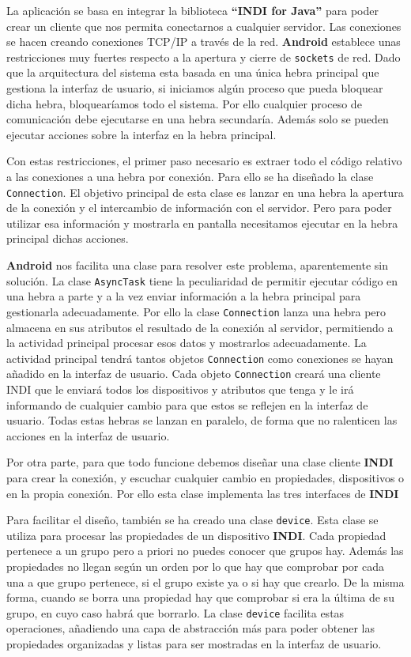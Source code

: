 La aplicación se basa en integrar la biblioteca \textbf{``INDI for Java''} para poder crear un cliente que nos permita conectarnos a cualquier servidor. Las conexiones se hacen creando conexiones TCP/IP a través de la red. \textbf{Android} establece unas restricciones muy fuertes respecto a la apertura y cierre de \texttt{sockets} de red. Dado que la arquitectura del sistema esta basada en una única hebra principal que gestiona la interfaz de usuario, si iniciamos algún proceso que pueda bloquear dicha hebra, bloquearíamos todo el sistema. Por ello cualquier proceso de comunicación debe ejecutarse en una hebra secundaría. Además solo se pueden ejecutar acciones sobre la interfaz en la hebra principal.

\bigskip
Con estas restricciones, el primer paso necesario es extraer todo el código relativo a las conexiones a una hebra por conexión. Para ello se ha diseñado la clase \texttt{Connection}. El objetivo principal de esta clase es lanzar en una hebra la apertura de la conexión y el intercambio de información con el servidor. Pero para poder utilizar esa información y mostrarla en pantalla necesitamos ejecutar en la hebra principal dichas acciones. 

\bigskip
\textbf{Android} nos facilita una clase para resolver este problema, aparentemente sin solución. La clase \texttt{AsyncTask} tiene la peculiaridad de permitir ejecutar código en una hebra a parte y a la vez enviar información a la hebra principal para gestionarla adecuadamente. Por ello la clase \texttt{Connection} lanza una hebra pero almacena en sus atributos el resultado de la conexión al servidor, permitiendo a la actividad principal procesar esos datos y mostrarlos adecuadamente. La actividad principal tendrá tantos objetos \texttt{Connection} como conexiones se hayan añadido en la interfaz de usuario. Cada objeto \texttt{Connection} creará una cliente INDI que le enviará todos los dispositivos y atributos que tenga y le irá informando de cualquier cambio para que estos se reflejen en la interfaz de usuario. Todas estas hebras se lanzan en paralelo, de forma que no ralenticen las acciones en la interfaz de usuario.

\bigskip
Por otra parte, para que todo funcione debemos diseñar una clase cliente \textbf{INDI} para crear la conexión, y escuchar cualquier cambio en propiedades, dispositivos o en la propia conexión. Por ello esta clase implementa las tres interfaces de \textbf{INDI}

\bigskip
Para facilitar el diseño, también se ha creado una clase \texttt{device}. Esta clase se utiliza para procesar las propiedades de un dispositivo \textbf{INDI}. Cada propiedad pertenece a un grupo pero a priori no puedes conocer que grupos hay. Además las propiedades no llegan según un orden por lo que hay que comprobar por cada una a que grupo pertenece, si el grupo existe ya o si hay que crearlo. De la misma forma, cuando se borra una propiedad hay que comprobar si era la última de su grupo, en cuyo caso habrá que borrarlo. La clase \texttt{device} facilita estas operaciones, añadiendo una capa de abstracción más para poder obtener las propiedades organizadas y listas para ser mostradas en la interfaz de usuario.

